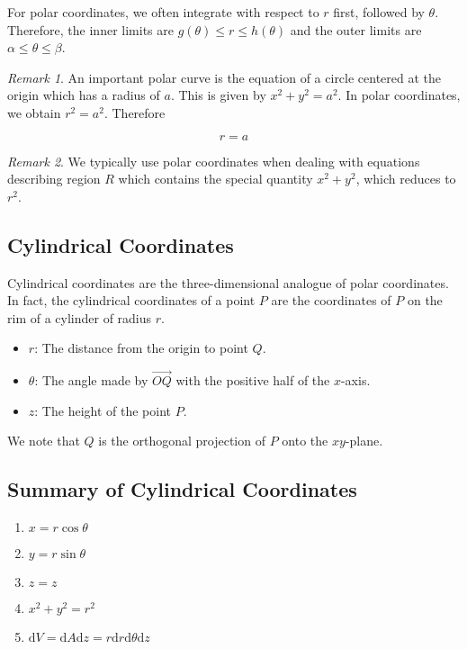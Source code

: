 \documentclass[11pt]{article}
\theoremstyle{plain} %
\theoremstyle{definition}
\theoremstyle{example}
\theoremstyle{remark}
\newtheorem*{remark}{Remark}
\begin{document}
For polar coordinates, we often integrate with respect to $r$ first, followed by $\theta$. Therefore, the inner limits are $g(\theta) \leq r \leq h(\theta)$ and the outer limits are $\alpha \leq \theta \leq \beta$.

\begin{remark}
An important polar curve is the equation of a circle centered at the origin which has a radius of $a$. This is given by $x^2+y^2=a^2$. In polar coordinates, we obtain $r^2 = a^2$. Therefore

$$r=a$$
\end{remark}

\begin{remark}
We typically use polar coordinates when dealing with equations describing region $R$ which contains the special quantity $x^2+y^2$, which reduces to $r^2$. 
\end{remark}

\subsection{Cylindrical Coordinates}
Cylindrical coordinates are the three-dimensional analogue of polar coordinates. In fact, the cylindrical coordinates of a point $P$ are the coordinates of $P$ on the rim of a cylinder of radius $r$. 

\begin{itemize}
	\item $r$: The distance from the origin to point $Q$.
	\item $\theta$: The angle made by $\overrightarrow{OQ}$ with the positive half of the $x$-axis. 
	\item $z$: The height of the point $P$.
\end{itemize}

We note that $Q$ is the orthogonal projection of $P$ onto the $xy$-plane. 


\subsection{Summary of Cylindrical Coordinates}

\begin{enumerate}
	\item $x=r\cos\theta$
	\item $y=r\sin\theta$
	\item $z = z$
	\item $x^2+y^2=r^2$
	\item $\mathrm d V = \mathrm d A \mathrm d z = r \mathrm d r \mathrm d \theta \mathrm d z$
\end{enumerate}
\end{document}
